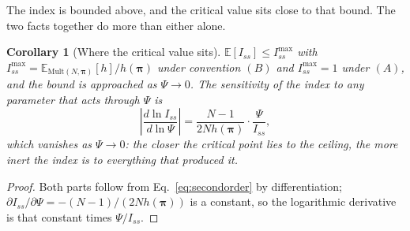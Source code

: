 \documentclass[preprint,12pt,authoryear]{elsarticle}
\newcommand{\Iss}{I_{ss}}
\newcommand{\bpi}{\boldsymbol{\pi}}
\newcommand{\E}{\mathbb{E}}
\newcommand{\Mult}{\mathrm{Mult}}
\newtheorem{corollary}[theorem]{Corollary}
\theoremstyle{definition}
\theoremstyle{remark}
\begin{document}
The index is bounded above, and the critical value sits close to that bound.
The two facts together do more than either alone.

\begin{corollary}[Where the critical value sits]
\label{cor:ceilinggap}
$\E[\Iss]\le\Iss^{\max}$ with
$\Iss^{\max}=\E_{\Mult(N,\bpi)}[h]/h(\bpi)$ under convention $(B)$ and
$\Iss^{\max}=1$ under $(A)$, and the bound is approached as $\Psi\to0$. The
sensitivity of the index to any parameter that acts through $\Psi$ is
\begin{equation}
  \left|\frac{d\ln\Iss}{d\ln\Psi}\right|=\frac{N-1}{2Nh(\bpi)}\cdot\frac{\Psi}{\Iss},
  \label{eq:sensitivity}
\end{equation}
which vanishes as $\Psi\to0$: the closer the critical point lies to the
ceiling, the more inert the index is to everything that produced it.
\end{corollary}

\begin{proof}
Both parts follow from Eq.~\eqref{eq:secondorder} by differentiation;
$\partial\Iss/\partial\Psi=-(N-1)/(2Nh(\bpi))$ is a constant, so the
logarithmic derivative is that constant times $\Psi/\Iss$.
\end{proof}
\end{document}
